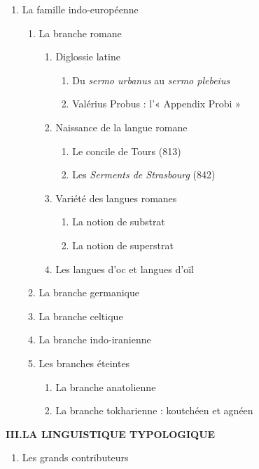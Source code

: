 \begin{keybox}
\begin{enumerate}[label=\arabic*.]
\begin{enumerate}[label=\textcircled{\scriptsize\arabic*}]
\item Les langues sinoxéniques
\end{enumerate}
\item La famille indo-européenne
\begin{enumerate}[label=\textcircled{\scriptsize\arabic*}]
\item La branche romane
\begin{enumerate}[label=\arabic*.]
\item Diglossie latine
\begin{enumerate}[label=\arabic*)]
\item Du \textit{sermo urbanus} au \textit{sermo plebeius}
\item Valérius Probus : l’« Appendix Probi »
\end{enumerate}
\item Naissance de la langue romane
\begin{enumerate}[label=\arabic*)]
\item Le concile de Tours (813)
\item Les \textit{Serments de Strasbourg} (842)
\end{enumerate}
\item Variété des langues romanes
\begin{enumerate}[label=\arabic*)]
\item La notion de substrat
\item La notion de superstrat
\end{enumerate}
\item Les langues d’oc et langues d’oïl
\end{enumerate}
\item La branche germanique
\item La branche celtique
\item La branche indo-iranienne
\item Les branches éteintes
\begin{enumerate}[label=\arabic*.]
\item La branche anatolienne
\item La branche tokharienne : koutchéen et agnéen
\end{enumerate}
\end{enumerate}
\end{enumerate}
\textbf{III.\quad LA LINGUISTIQUE TYPOLOGIQUE}
\begin{enumerate}[label=\arabic*.]
\item Les grands contributeurs
\begin{enumerate}[label=\textcircled{\scriptsize\arabic*}]

\end{enumerate}
\end{enumerate}
\end{keybox}
